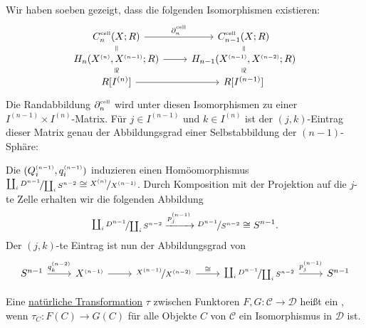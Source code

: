\begin{bemerkung}[{name=[{Matrixform der zellulären Randabbildung}]}]
	Wir haben soeben gezeigt, dass die folgenden Isomorphismen existieren:
	\[
		\begin{tikzcd}[row sep=tiny]
			C_n^\cell(X;R) \arrow[draw=none]{d}[sloped,auto=false]{=} \rar["\partial_n^\cell"] & C_{n-1}^\cell(X;R) \arrow[draw=none]{d}[sloped,auto=false]{=}\\
			H_n \enbrace*{X^\ssbrace{n},X^\ssbrace{n-1};R} \rar \arrow[draw=none]{d}[sloped,auto=false]{\cong}
			& H_{n-1} \enbrace*{X^\ssbrace{n-1},X^\ssbrace{n-2};R} \arrow[draw=none]{d}[sloped,auto=false]{\cong}\\
			R[I^{(n)}] \rar & R[I^{(n-1)}]  
		\end{tikzcd}
	\]
	Die Randabbildung $\partial_n^\cell$ wird unter diesen Isomorphismen zu einer $I^{(n-1)} \times I^{(n)}$-Matrix. Für $j \in I^{(n-1)}$ und $k \in I^{(n)}$ ist der 
	$(j,k)$-Eintrag dieser Matrix genau der Abbildungsgrad einer Selbstabbildung der $(n-1)$-Sphäre: 

	Die $(Q_i^{\scriptscriptstyle(n-1)}, q_i^{\scriptscriptstyle(n-1)})$ induzieren einen Homöomorphismus
	$\nicefrac{\coprod_i D^{n-1}}{\coprod_i S^{n-2}} \cong \nicefrac{X^{\scriptscriptstyle(n)}}{X^{\scriptscriptstyle(n-1)}}$. Durch Komposition mit der Projektion auf die $j$-te Zelle erhalten 
	wir die folgenden Abbildung
	\[
		\nicefrac{\coprod_i D^{n-1}}{\coprod_i S^{n-2}} \xrightarrow{p_j^{(n-1)}}  \nicefrac{D^{n-1}}{S^{n-2}} \cong S^{n-1}.
	\] 
	Der $(j,k)$-te Eintrag ist nun der 
	Abbildungsgrad von 
	\[
		\begin{tikzcd}
			S^{n-1} \rar["q^{(n-2)}_k"] & X^\ssbrace{n-1} \rar & \nicefrac{X^\ssbrace{n-1}}{X^\ssbrace{n-2}} \rar["\cong"] & \nicefrac{\coprod_i D^{n-1}}{\coprod_i S^{n-2}} \rar["p_j^{(n-1)}"]
			& S^{n-1}
		\end{tikzcd}
	\]
\end{bemerkung}

\begin{definition}[{name=[natürlicher Isomorphismus]}]
	Eine \hyperref[def:16]{natürliche Transformation} $\tau$ zwischen Funktoren $F,G\colon \mathcal{C} \to \mathcal{D}$ heißt ein , wenn $\tau_C \colon F(C) \to G(C)$ für alle Objekte $C$ von $\mathcal{C}$ ein Isomorphismus in $\mathcal{D}$ ist.
\end{definition}

